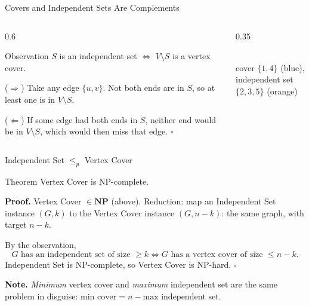 \documentclass[10pt,aspectratio=169]{beamer}
\begin{document}
\begin{frame}{Covers and Independent Sets Are Complements}
  \begin{columns}[c]
    \begin{column}{0.6\textwidth}
      \begin{block}{Observation}
        $S$ is an independent set $\iff$ $V \setminus S$ is a vertex cover.
      \end{block}

      ($\Rightarrow$) Take any edge $\{u, v\}$. Not both ends are in $S$, so
      at least one is in $V \setminus S$.

      \medskip
      ($\Leftarrow$) If some edge had both ends in $S$, neither end would be
      in $V \setminus S$, which would then miss that edge.
      \hfill $\square$
    \end{column}
    \begin{column}{0.35\textwidth}
      \begin{center}
      \\[2pt]
      \small cover $\{1, 4\}$ (blue),\\ independent set $\{2, 3, 5\}$
      (orange)
      \end{center}
    \end{column}
  \end{columns}
\end{frame}

\begin{frame}{Independent Set $\le_p$ Vertex Cover}
  \begin{block}{Theorem}
    Vertex Cover is NP-complete.
  \end{block}

  \textbf{Proof.} Vertex Cover $\in \mathbf{NP}$ (above). Reduction: map an
  Independent Set instance $(G, k)$ to the Vertex Cover instance
  $(G, n - k)$: the same graph, with target $n - k$.

  \medskip
  By the observation,
  \[
    G \text{ has an independent set of size } \ge k
    \iff G \text{ has a vertex cover of size } \le n - k.
  \]
  Independent Set is NP-complete, so Vertex Cover is NP-hard.
  \hfill $\square$

  \pause
  \bigskip
  \textbf{Note.} \emph{Minimum} vertex cover and \emph{maximum} independent
  set are the same problem in disguise:
  $\text{min cover} = n - \text{max independent set}$.
\end{frame}
\end{document}
